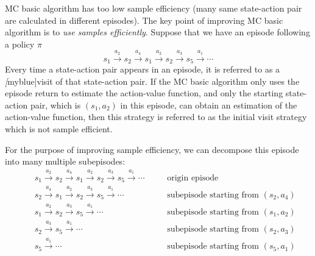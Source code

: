     MC basic algorithm has too low sample efficiency (many same state-action pair are calculated in different episodes). The key point of improving MC basic
    algorithm is to \emph{use samples efficiently}. Suppose that we have an episode following a policy $\pi$
    \begin{equation*}
      s_{1} \stackrel{a_{2}}{\longrightarrow} s_{2} \stackrel{a_{4}}{\longrightarrow} s_{1} \stackrel{a_{2}}{\longrightarrow} s_{2}
      \stackrel{a_{3}}{\longrightarrow} s_{5} \stackrel{a_{1}}{\longrightarrow} \cdots
    \end{equation*}
    Every time a state-action pair appears in an episode, it is referred to as a \emph[myblue]{visit} of that state-action pair. If the MC basic algorithm only
    uses the episode return to estimate the action-value function, and only the starting state-action pair, which is $(s_{1}, a_{2})$ in this episode, can
    obtain an estimation of the action-value function, then this strategy is referred to as the initial visit strategy which is not sample efficient. \par For
    the purpose of improving sample efficiency, we can decompose this episode into many multiple subepisodes:
    \begin{align*}
       &  & s_{1} \stackrel{a_{2}}{\longrightarrow} s_{2} \stackrel{a_{4}}{\longrightarrow} s_{1} \stackrel{a_{2}}{\longrightarrow} s_{2} \stackrel{a_{3}}{\longrightarrow} s_{5} \stackrel{a_{1}}{\longrightarrow} \cdots &  & \  & \text{origin episode}                          \\
       &  & s_{2} \stackrel{a_{4}}{\longrightarrow} s_{1} \stackrel{a_{2}}{\longrightarrow} s_{2} \stackrel{a_{3}}{\longrightarrow} s_{5} \stackrel{a_{1}}{\longrightarrow} \cdots                                         &  & \  & \text{subepisode starting from } (s_{2},a_{4}) \\
       &  & s_{1} \stackrel{a_{2}}{\longrightarrow} s_{2} \stackrel{a_{3}}{\longrightarrow} s_{5} \stackrel{a_{1}}{\longrightarrow} \cdots                                                                                 &  & \  & \text{subepisode starting from } (s_{1},a_{2}) \\
       &  & s_{2} \stackrel{a_{3}}{\longrightarrow} s_{5} \stackrel{a_{1}}{\longrightarrow} \cdots                                                                                                                         &  & \  & \text{subepisode starting from } (s_{2},a_{3}) \\
       &  & s_{5} \stackrel{a_{1}}{\longrightarrow} \cdots                                                                                                                                                                 &  & \  & \text{subepisode starting from } (s_{5},a_{1})
    \end{align*}
